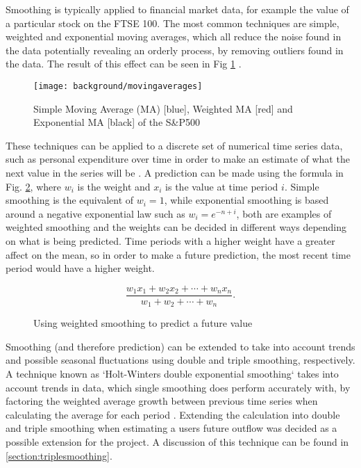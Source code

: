 Smoothing is typically applied to financial market data, for example the value of a particular stock on the FTSE 100. The most common techniques are simple, weighted and exponential moving averages, which all reduce the noise found in the data potentially revealing an orderly process, by removing outliers found in the data. The result of this effect can be seen in Fig \ref{fig:dashweightedaverages} \parencite{dash2012movingaverages}.

\begin{figure}[h]
    \centering
    \texttt{[image: background/movingaverages]}
    \caption[SMA, WMA and EMA of the S\&P500]{Simple Moving Average (MA) [blue], Weighted MA [red] and Exponential MA [black] of the S\&P500\protect\footnotemark  \parencite[Fig. 5]{dash2012movingaverages}}
    \label{fig:dashweightedaverages}
\end{figure}

These techniques can be applied to a discrete set of numerical time series data, such as personal expenditure over time in order to make an estimate of what the next value in the series will be \parencite{filliben2003nist}. A prediction can be made using the formula in Fig. \ref{fig:weightedmeanforumla}, where $w_{i}$ is the weight and $x_i$ is the value at time period $i$. Simple smoothing is the equivalent of $w_i = 1$, while exponential smoothing is based around a negative exponential law such as $w_i = e^{-n+i}$, both are examples of weighted smoothing and the weights can be decided in different ways depending on what is being predicted. Time periods with a higher weight have a greater affect on the mean, so in order to make a future prediction, the most recent time period would have a higher weight.

\begin{figure}[h]
    \centering
    \[
        \frac{w_1 x_1 + w_2 x_2 + \cdots + w_n x_n}{w_1 + w_2 + \cdots + w_n}.
    \]
    \caption{Using weighted smoothing to predict a future value}
    \label{fig:weightedmeanforumla}
\end{figure}

Smoothing (and therefore prediction) can be extended to take into account trends and possible seasonal fluctuations using double and triple smoothing, respectively. A technique known as `Holt-Winters double exponential smoothing` takes into account trends in data, which single smoothing does perform accurately with, by factoring the weighted average growth between previous time series when calculating the average for each period \parencite{kalekar2004holtwinters}.
% 
Extending the calculation into double and triple smoothing when estimating a users future outflow was decided as a possible extension for the project. A discussion of this technique can be found in \autoref{section:triplesmoothing}.

